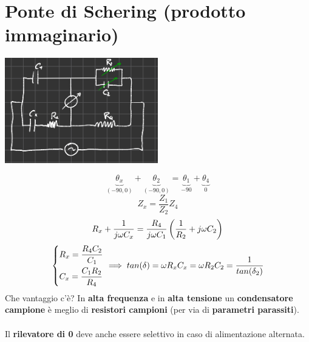 \section{Ponte di Schering (prodotto immaginario)}
  \begin{center}
    \includegraphics[width=0.50\textwidth]{Images/figure36.png}
  \end{center}
\begin{equation*}
    \underbrace{\theta_x}_{(- 90 , 0)} + \underbrace{\theta_2}_{(- 90 , 0)} = \underbrace{\theta_1}_{- 90} + \underbrace{\theta_4}_{0}
\end{equation*}
\begin{equation*}
    Z_x = \frac{Z_1}{Z_2} Z_4 
\end{equation*}
\begin{equation*}
    R_x + \frac{1}{j \omega C_x} = \frac{R_4}{j\omega C_1} \left(\frac{1}{R_2} + j \omega C_2 \right)
\end{equation*}
\begin{equation*}
    \begin{dcases}
        R_x = \frac{R_4 C_2}{C_1}\\
        C_x = \frac{C_1 R_2}{R_4}
    \end{dcases}
    \implies tan(\delta) = \omega R_x C_x = \omega R_2 C_2 = \frac{1}{tan(\delta_2)}
\end{equation*}
Che vantaggio c'è? In \textbf{alta frequenza} e in \textbf{alta tensione} un \textbf{condensatore campione} è meglio di \textbf{resistori campioni} (per via di \textbf{parametri parassiti}).\\ \\
Il \textbf{rilevatore di 0} deve anche essere selettivo in caso di alimentazione alternata.
